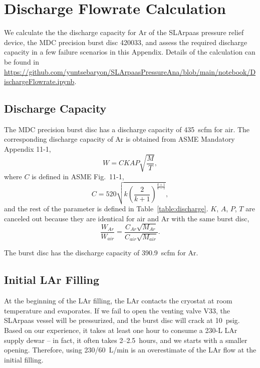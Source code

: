 \section{Discharge Flowrate Calculation}
\label{app:discharge}

We calculate the the discharge capacity for Ar of the SLArpaas pressure relief device, 
the MDC precision burst disc 420033,
and assess the required discharge capacity in a few failure scenarios in this Appendix.
Details of the calculation can be found in 
\url{https://github.com/yuntsebaryon/SLArpaasPressureAna/blob/main/notebook/DischargeFlowrate.ipynb}.

\subsection{Discharge Capacity}
\label{app:discharge_capacity}

The MDC precision burst disc has a discharge capacity of 435~scfm for air.
The corresponding discharge capacity of Ar is obtained from ASME Mandatory Appendix 11-1,
\begin{equation}
    \label{eq:discharge}
    W = CKAP\sqrt{\frac{M}{T}},
\end{equation}
where $C$ is defined in ASME Fig.~11-1,
\begin{equation}
    \label{eq:constant_k}
    C = 520\sqrt{k\left(\frac{2}{k+1}\right)^{\frac{k+1}{k-1}}},
\end{equation}
and the rest of the parameter is defined in Table~\ref{table:discharge}.
$K$, $A$, $P$, $T$ are canceled out because they are identical for air and Ar
with the same burst disc,
\begin{equation}
    \frac{W_{Ar}}{W_{air}} = \frac{C_{Ar}\sqrt{M_{Ar}}}{C_{air}\sqrt{M_{air}}}.
\end{equation}



The burst disc has the discharge capacity of 390.9~scfm for Ar.

\subsection{Initial LAr Filling}

At the beginning of the LAr filling, the LAr contacts the cryostat at room 
temperature and evaporates.
If we fail to open the venting valve V33, the SLArpaas vessel will be pressurized,
and the burst disc will crack at 10~psig.
Based on our experience, it takes at least one hour to consume a 230-L LAr
supply dewar -- in fact, it often takes 2--2.5~hours, and we starts with
a smaller opening.
Therefore, using 230/60~L/min is an overestimate of the LAr flow at the
initial filling. \\

